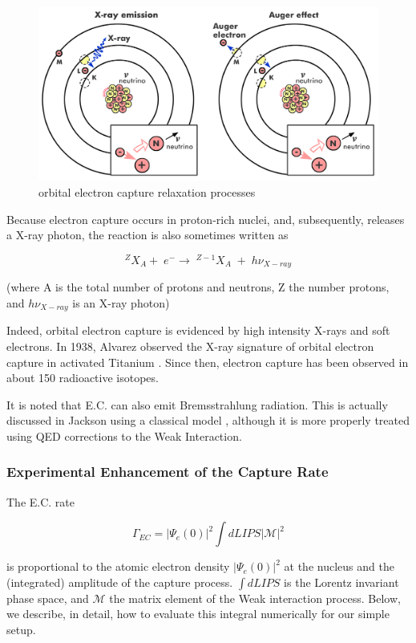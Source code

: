 \documentclass[%
 aip,
 jmp,%
 amsmath,amssymb,
 reprint,%
]{revtex4-1}
\begin{document}
\begin{figure}
   \includegraphics[scale=0.04]{img/EC-img.png}
   \caption{orbital electron capture relaxation processes}
  \label{fig:ec1}
\end{figure}

Because electron capture occurs in proton-rich nuclei, and, subsequently, releases a X-ray photon, the reaction is also sometimes written as

$$^{Z}X_{A}+\;e^{-}\rightarrow\;^{Z-1}X_{A}\;+\;h\nu_{X-ray}$$

(where A is the total number of protons and neutrons, Z the number protons, and $h\nu_{X-ray}$ is an X-ray photon)

Indeed, orbital electron capture is evidenced by high intensity X-rays and soft electrons.  In 1938, Alvarez observed the X-ray signature of orbital electron capture in activated Titanium \cite{alvarez}. Since then, electron capture has been observed in about 150 radioactive isotopes.

It is noted that E.C. can also emit Bremsstrahlung radiation.  This is actually discussed in Jackson using a classical model \cite{jackson}, although it is more properly treated using QED corrections to the Weak Interaction\cite{Jauch}.  

\subsubsection{Experimental Enhancement of the Capture Rate}

The E.C. rate 

$$\Gamma_{EC}=\big\vert\Psi_{e}(0)\big\vert^{2}\int dLIPS\big\vert\mathcal{M}\big\vert^{2}$$

is proportional to the atomic electron density  $\big\vert\Psi_{e}(0)\big\vert^{2}$  at the nucleus and the (integrated) amplitude of the capture process.
$\int dLIPS$ is the Lorentz invariant phase space,  and $\mathcal{M}$  the matrix element of the Weak interaction process.  Below, we describe, in detail,
how to evaluate this integral numerically for our simple setup.
\end{document}
